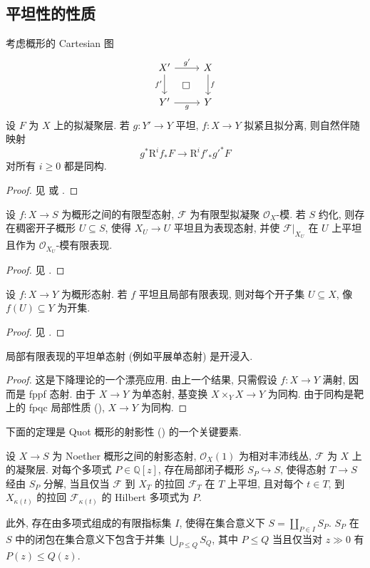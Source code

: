 \subsection{平坦性的性质}\label{src:A.2.2-subsection}
\begin{proposition}[平坦基变换]\label{src:A.2.12}
考虑概形的 Cartesian 图
\[
\begin{tikzcd}[column sep=2.5em,row sep=2em]
X'\arrow[r,"g'"]\arrow[d,"f'"']\arrow[dr,phantom,"\square" description]&X\arrow[d,"f"]\\
Y'\arrow[r,"g"']&Y
\end{tikzcd}
\]
设 $F$ 为 $X$ 上的拟凝聚层. 若 $g:Y'\to Y$ 平坦, $f:X\to Y$ 拟紧且拟分离, 则自然伴随映射
\[
g^*\mathrm R^i f_*F\longrightarrow\mathrm R^i f'_*g'^*F
\]
对所有 $i\geq0$ 都是同构.
\end{proposition}
\begin{proof}
见 \cite[命题 III.$9.3$]{Har77} 或 \cite[Tag 02KH]{SP}.
\end{proof}
\begin{theorem}[一般平坦性]\label{src:A.2.13}
设 $f:X\to S$ 为概形之间的有限型态射, $\mathcal F$ 为有限型拟凝聚 $\mathcal O_X$-模. 若 $S$ 约化, 则存在稠密开子概形 $U\subseteq S$, 使得 $X_U\to U$ 平坦且为表现态射, 并使 $\mathcal F|_{X_U}$ 在 $U$ 上平坦且作为 $\mathcal O_{X_U}$-模有限表现.
\end{theorem}
\begin{proof}
见 \cite[Tag 052B]{SP}.
\end{proof}
\begin{proposition}\label{src:A.2.14}
设 $f:X\to Y$ 为概形态射. 若 $f$ 平坦且局部有限表现, 则对每个开子集 $U\subseteq X$, 像 $f(U)\subseteq Y$ 为开集.
\end{proposition}
\begin{proof}
见 \cite[Tag 01UA]{SP}.
\end{proof}
\begin{proposition}\label{src:A.2.15}
局部有限表现的平坦单态射 (例如平展单态射) 是开浸入.
\end{proposition}
\begin{proof}
这是下降理论的一个漂亮应用. 由上一个结果, 只需假设 $f:X\to Y$ 满射, 因而是 fppf 态射. 由于 $X\to Y$ 为单态射, 基变换 $X\times_Y X\to Y$ 为同构. 由于同构是靶上的 fpqc 局部性质 (), $X\to Y$ 为同构.
\end{proof}
下面的定理是 Quot 概形的射影性 () 的一个关键要素.
\begin{theorem}[平坦化分层的存在性]\label{src:A.2.16}
设 $X\to S$ 为 Noether 概形之间的射影态射, $\mathcal O_X(1)$ 为相对丰沛线丛, $\mathcal F$ 为 $X$ 上的凝聚层. 对每个多项式 $P\in\mathbb Q[z]$, 存在局部闭子概形 $S_P\hookrightarrow S$, 使得态射 $T\to S$ 经由 $S_P$ 分解, 当且仅当 $\mathcal F$ 到 $X_T$ 的拉回 $\mathcal F_T$ 在 $T$ 上平坦, 且对每个 $t\in T$, 到 $X_{\kappa(t)}$ 的拉回 $\mathcal F_{\kappa(t)}$ 的 Hilbert 多项式为 $P$.

此外, 存在由多项式组成的有限指标集 $I$, 使得在集合意义下 $S=\coprod_{P\in I}S_P$. $S_P$ 在 $S$ 中的闭包在集合意义下包含于并集 $\bigcup_{P\leq Q}S_Q$, 其中 $P\leq Q$ 当且仅当对 $z\gg0$ 有 $P(z)\leq Q(z)$.
\end{theorem}
